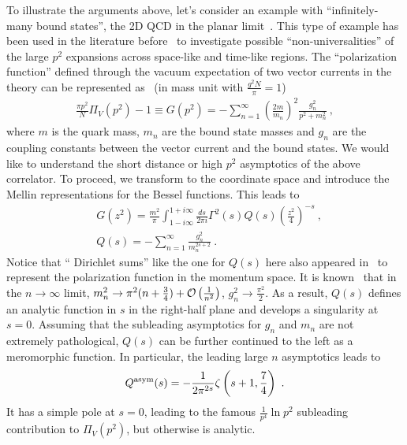 \documentclass[a4paper,11pt]{article}
\begin{document}
To illustrate the arguments above, let's consider an example with ``infinitely-many bound states'', the 2D QCD in the planar limit~\cite{tHooft:1974pnl}. This type of example has been used in the literature before~\cite{Boito:2017cnp} to investigate possible ``non-universalities'' of the large $p^2$ expansions across space-like and time-like regions. The ``polarization function'' defined through the vacuum expectation of two vector currents in the theory can be represented as~\cite{Einhorn:1976uz} (in mass unit with $\frac{g^2N}{\pi}=1$)
\begin{align}
\frac{\pi p^2}{N}\Pi_V(p^2)-1 \equiv G(p^2)=-\sum_{n=1}^{\infty}\left(\frac{2m}{m_n}\right)^2\frac{g_n^2}{p^2+m_n^2} \ ,
\end{align}
where $m$ is the quark mass, $m_n$ are the bound state masses and $g_n$ are the coupling constants between the vector current and the bound states. We would like to understand the short distance or high $p^2$ asymptotics of the above correlator. To proceed, we transform to the coordinate space and introduce the Mellin representations for the Bessel functions. This leads to
\begin{align}
&G(z^2)=\frac{m^2}{\pi}\int_{1-i\infty}^{1+i\infty} \frac{ds}{2\pi i}\Gamma^2(s) Q(s) \left(\frac{z^2}{4}\right)^{-s} \ , \\ 
&Q(s)=-\sum_{n=1}^{\infty}\frac{g_n^2}{m_n^{2s+2}} \ .
\end{align}
Notice that `` Dirichlet sums'' like the one for $Q(s)$ here also appeared  in~\cite{deRafael:2010ac} to represent the polarization function in the momentum space.  It is known~\cite{Einhorn:1976uz,Fateev:2009jf} that in the $n \rightarrow \infty$ limit, $m_n^2 \rightarrow \pi^2 (n+\frac{3}{4})+{\cal O}\left(\frac{1}{n^2}\right)$, $g_n^2 \rightarrow \frac{\pi^2}{2}$. As a result, $Q(s)$ defines an analytic function in $s$ in the right-half plane and develops a singularity at $s=0$. Assuming that the subleading asymptotics for $g_n$ and $m_n$ are not extremely pathological, $Q(s)$ can be further continued to the left as a meromorphic function. In particular, the leading large $n$ asymptotics leads to
\begin{align}\label{eq:Qasym}
Q^{\rm asym}(s)=-\frac{1}{2\pi^{2s}}\zeta \left(s+1,\frac{7}{4}\right) \ .
\end{align}
It has a simple pole at $s=0$, leading to the famous $\frac{1}{p^4}\ln p^2$ subleading contribution to $\Pi_V(p^2)$, but otherwise is analytic. 
\end{document}
